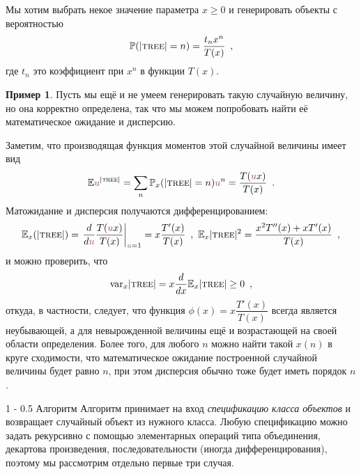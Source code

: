 \documentclass[a5paper]{article}
\makeatletter
\theoremstyle{definition}
\newtheorem{example}{Пример}
\renewcommand{\subsection}{\@startsection
{subsection}%
{1}%
{\z@}%
{-\baselineskip}%
{0.5\baselineskip}%
{\centering\large\scshape}} %
\makeatother
\begin{document}
Мы хотим выбрать некое значение параметра \( x \geq 0 \) и генерировать объекты
с вероятностью
\begin{equation}
    \mathbb P( |\text{\textsc{tree}}| = n) = \dfrac{t_n x^n}{T(x)} \enspace ,
\end{equation}
где \( t_n \) это коэффициент при \( x^n \) в функции \( T(x) \).
\begin{example}
    Пусть мы ещё и не умеем генерировать такую случайную величину, но она корректно
определена, так что мы можем попробовать найти её математическое ожидание и
дисперсию.
    
    Заметим, что производящая функция моментов этой случайной величины имеет вид
\begin{equation}
    \mathbb E \uu^{ |\text{\textsc{tree}}|} =
    \sum_n \mathbb P_x ( |\text{\textsc{tree}}| = n) \uu^n
    = \dfrac{T(\uu x)}{T(x)} \enspace.
\end{equation}
Матожидание и дисперсия получаются дифференцированием:
\begin{equation}
    \mathbb E_x ( | \text{\textsc{tree}} | ) = \left.
        \dfrac{d}{d \uu} \dfrac{T(\uu x)}{T(x)} 
    \right|_{\uu = 1}
    = x \dfrac{T'(x)}{T(x)}
    \enspace , \ 
    \mathbb E_x |\text{\textsc{tree}}|^2 = 
    \dfrac
        {x^2 T''(x) + x T'(x)}{T(x)}
    \enspace ,
\end{equation}
и можно проверить, что 
\begin{equation}
    \mathrm{var}_x |\text{\textsc{tree}}| = 
    x \dfrac{d}{dx} \mathbb E_x  |\text{\textsc{tree}}| 
    \geq 0 \enspace ,
\end{equation}
откуда, в частности, следует, что функция \( \phi(x) = x \dfrac{T'(x)}{T(x)} \)
всегда является неубывающей, а для невырожденной величины ещё и возрастающей на
своей области определения. Более того, для любого \( n \) можно найти такой \(
x(n) \) в круге сходимости, что математическое ожидание построенной случайной
величины будет равно \( n \), при этом дисперсия обычно тоже будет иметь порядок
\( n \).
\end{example}
\subsection{Алгоритм}
Алгоритм принимает на вход \textit{спецификацию класса объектов} и возвращает
случайный объект из нужного класса. Любую спецификацию можно задать рекурсивно с
помощью элементарных операций типа объединения, декартова произведения,
последовательности (иногда дифференцирования), поэтому мы рассмотрим отдельно
первые три случая.
\end{document}
